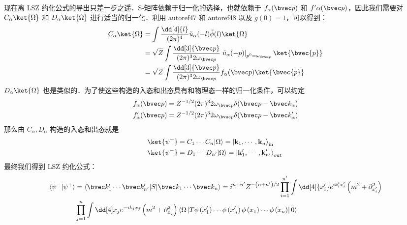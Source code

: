 现在离 LSZ 约化公式的导出只差一步之遥．S-矩阵依赖于归一化的选择，也就依赖于 $f_\alpha(\bvec p)$ 和 $f'\alpha(\bvec p)$，因此我们需要对 $C_\alpha\ket{\Omega}$ 和 $D_\alpha\ket{\Omega}$ 进行适当的归一化．利用 autoref47 和 autoref48 以及 $\tilde g(0)=1$，可以得到：
\begin{equation} \begin{aligned}
C_\alpha\ket{\Omega}&=\int \frac{\dd[4]{l}}{(2\pi)^4} \tilde{u}_\alpha(-l)\tilde{\phi}(l)\ket{\Omega}\\
&=\sqrt{Z}\int \frac{\dd[3]{\bvec p}}{(2\pi)^3 2\omega_{\bvec p}} \left.\tilde{u}_\alpha(-p)
\right|_{p^0=\omega_{\bvec p}} \ket{\bvec{p}}\\
&=\sqrt{Z}\int \frac{\dd[3]{\bvec p}}{(2\pi)^3 2\omega_{\bvec p}} f_\alpha(\bvec p) \ket{\bvec{p}}
\end{aligned}\end{equation}
$D_\alpha\ket{\Omega}$ 也是类似的．为了使这些构造的入态和出态具有和物理态一样的归一化条件，可以约定
\begin{equation} \begin{aligned}
&f_\alpha(\bvec p)=Z^{-1/2}(2\pi)^3 2\omega_{\bvec p}\delta(\bvec p-\bvec k_\alpha)\\
&f'_\alpha(\bvec p)=Z^{-1/2}(2\pi)^3 2\omega_{\bvec p}\delta(\bvec p-\bvec k'_\alpha)
\end{aligned}\end{equation}
那么由 $C_\alpha,D_\alpha$ 构造的入态和出态就是
\begin{equation} \begin{aligned}
\ket{\psi^+} &=C_1 \cdots C_n|\Omega\rangle=\left|\mathbf{k}_1, \cdots, \mathbf{k}_n\right\rangle_{\text {in }} \\
\ket{\psi^-} &=D_1 \cdots D_{n'}|\Omega\rangle=\left|\mathbf{k}_1^{\prime}, \cdots, \mathbf{k}_{n'}^{\prime}\right\rangle_{\text {out }}
\end{aligned}\end{equation}
最终我们得到 LSZ 约化公式：
\begin{equation} \begin{aligned}
\notag\langle\psi^-|\psi^+\rangle&=\langle\bvec k'_1 \cdots \bvec k'_{n'}|S|\bvec k_1\cdots\bvec k_n\rangle= i^{n+n'} Z^{-\left(n+n'\right) / 2}
\prod_{i=1}^{n'}\int \dd[4]{x_i'} e^{i k_i' x_i'}\left(m^2+\partial_{x_i'}^2\right)  \\
& \prod_{j=1}^n\int\dd[4] x_j e^{-i k_j x_j}\left(m^2+\partial_{x_j}^2\right)
\left\langle \Omega\left|T \phi\left(x_1'\right) \cdots \phi\left(x_n'\right) \phi\left(x_{1}\right) \cdots \phi\left(x_{n}\right)\right| 0\right\rangle
\end{aligned}\end{equation} 